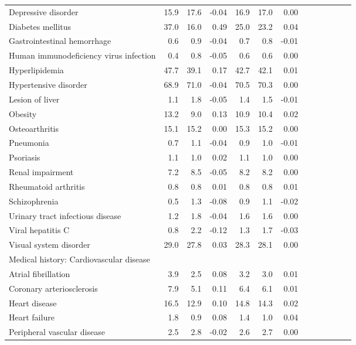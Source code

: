 \documentclass[11pt,]{article}
\begin{document}
\begin{longtable}{lrrrrrrrrrrrr}
      Depressive disorder & 15.9 & 17.6 & -0.04 & 16.9 & 17.0 &  0.00 \\ 
      Diabetes mellitus & 37.0 & 16.0 &  0.49 & 25.0 & 23.2 &  0.04 \\ 
      Gastrointestinal hemorrhage &  0.6 &  0.9 & -0.04 &  0.7 &  0.8 & -0.01 \\ 
      Human immunodeficiency virus infection &  0.4 &  0.8 & -0.05 &  0.6 &  0.6 &  0.00 \\ 
      Hyperlipidemia & 47.7 & 39.1 &  0.17 & 42.7 & 42.1 &  0.01 \\ 
      Hypertensive disorder & 68.9 & 71.0 & -0.04 & 70.5 & 70.3 &  0.00 \\ 
      Lesion of liver &  1.1 &  1.8 & -0.05 &  1.4 &  1.5 & -0.01 \\ 
      Obesity & 13.2 &  9.0 &  0.13 & 10.9 & 10.4 &  0.02 \\ 
      Osteoarthritis & 15.1 & 15.2 &  0.00 & 15.3 & 15.2 &  0.00 \\ 
      Pneumonia &  0.7 &  1.1 & -0.04 &  0.9 &  1.0 & -0.01 \\ 
      Psoriasis &  1.1 &  1.0 &  0.02 &  1.1 &  1.0 &  0.00 \\ 
      Renal impairment &  7.2 &  8.5 & -0.05 &  8.2 &  8.2 &  0.00 \\ 
      Rheumatoid arthritis &  0.8 &  0.8 &  0.01 &  0.8 &  0.8 &  0.01 \\ 
      Schizophrenia &  0.5 &  1.3 & -0.08 &  0.9 &  1.1 & -0.02 \\ 
      Urinary tract infectious disease &  1.2 &  1.8 & -0.04 &  1.6 &  1.6 &  0.00 \\ 
      Viral hepatitis C &  0.8 &  2.2 & -0.12 &  1.3 &  1.7 & -0.03 \\ 
      Visual system disorder & 29.0 & 27.8 &  0.03 & 28.3 & 28.1 &  0.00 \\ 
  Medical history: Cardiovascular disease &    &    &     &    &    &     \\ 
      Atrial fibrillation &  3.9 &  2.5 &  0.08 &  3.2 &  3.0 &  0.01 \\ 
      Coronary arteriosclerosis &  7.9 &  5.1 &  0.11 &  6.4 &  6.1 &  0.01 \\ 
      Heart disease & 16.5 & 12.9 &  0.10 & 14.8 & 14.3 &  0.02 \\ 
      Heart failure &  1.8 &  0.9 &  0.08 &  1.4 &  1.0 &  0.04 \\ 
      Peripheral vascular disease &  2.5 &  2.8 & -0.02 &  2.6 &  2.7 &  0.00 \\ 

\end{longtable}
\end{document}
